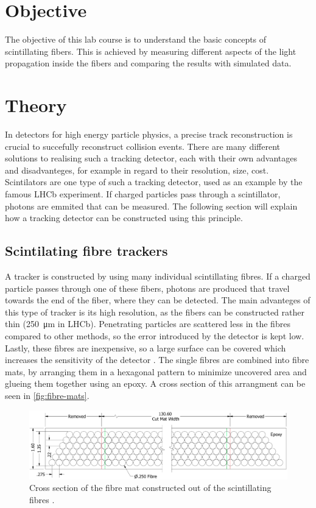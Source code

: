 \section{Objective}
\label{sec:Objective}

The objective of this lab course is to understand the basic concepts of scintillating fibers.
This is achieved by measuring different aspects of the light propagation inside the fibers and comparing the results
with simulated data.

\section{Theory}
\label{sec:Theory}

In detectors for high energy particle physics, a precise track reconstruction is crucial to succefully reconstruct collision events.
There are many different solutions to realising such a tracking detector, each with their own advantages and disadvanteges, for example
in regard to their resolution, size, cost. Scintilators are one type of such a tracking detector, used as an example by the famous
LHCb experiment. If charged particles pass through a scintillator, photons are emmited that can be measured. The following section will explain
how a tracking detector can be constructed using this principle.

\subsection{Scintilating fibre trackers}

A tracker is constructed by using many individual scintillating fibres. If a charged particle passes through one of these fibers, photons are produced that
travel towards the end of the fiber, where they can be detected. The main advanteges of this type of tracker is its high resolution, as the fibers can
be constructed rather thin (\qty{250}{\micro\meter} in LHCb). Penetrating particles are scattered less in the fibres compared to other methods,
so the error introduced by the detector is kept low. Lastly, these fibres are inexpensive, so a large surface can be covered which increases
the sensitivity of the detector \cite{SciFi}.
The single fibres are combined into fibre mats, by arranging them in a hexagonal pattern to minimize uncovered area and glueing
them together using an epoxy. A cross section of this arrangment can be seen in \autoref{fig:fibre-mats}.

\begin{figure}[H]
	\centering
	\includegraphics[width=0.9\linewidth]{pics/fibre_mat.png}
	\caption{Cross section of the fibre mat constructed out of the scintillating fibres \cite{SciFi}.}
	\label{fig:fibre-mats}
\end{figure}

